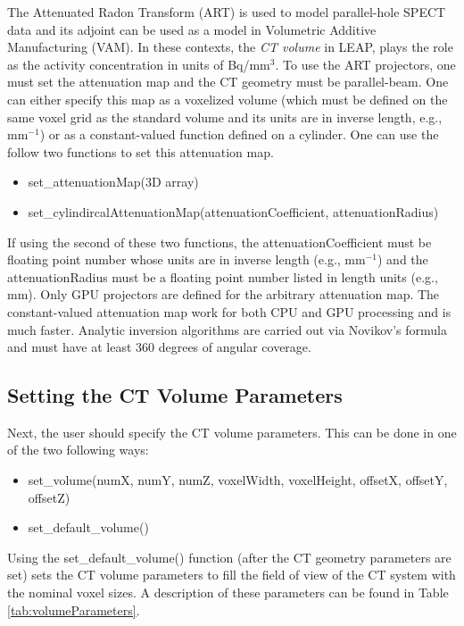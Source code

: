\documentclass[11pt]{article}
\begin{document}
The Attenuated Radon Transform (ART) is used to model parallel-hole SPECT data and its adjoint can be used as a model in Volumetric Additive Manufacturing (VAM).  In  these contexts, the \textit{CT volume} in LEAP, plays the role as the activity concentration in units of Bq/mm$^3$.  To use the ART projectors, one must set the attenuation map and the CT geometry must be parallel-beam.  One can either specify this map as a voxelized volume (which must be defined on the same voxel grid as the standard volume and its units are in inverse length, e.g., mm$^{-1}$) or as a constant-valued function defined on a cylinder.  One can use the follow two functions to set this attenuation map.
\begin{itemize}
    \item[] set\_attenuationMap(3D array)
    \item[] set\_cylindircalAttenuationMap(attenuationCoefficient, attenuationRadius)
\end{itemize}
If using the second of these two functions, the attenuationCoefficient must be floating point number whose units are in inverse length (e.g., mm$^{-1}$) and the attenuationRadius must be a floating point number listed in length units (e.g., mm).  Only GPU projectors are defined for the arbitrary attenuation map.  The constant-valued attenuation map work for both CPU and GPU processing and is much faster.  Analytic inversion algorithms are carried out via Novikov's formula \cite{Natterer_IP_2001} and must have at least 360 degrees of angular coverage.

\subsection{Setting the CT Volume Parameters}

Next, the user should specify the CT volume parameters.  This can be done in one of the two following ways:
\begin{itemize}
\item[] set\_volume(numX, numY, numZ, voxelWidth, voxelHeight, offsetX, offsetY, offsetZ)
\item[] set\_default\_volume()
\end{itemize}
Using the set\_default\_volume() function (after the CT geometry parameters are set) sets the CT volume parameters to fill the field of view of the CT system with the nominal voxel sizes.  A description of these parameters can be found in Table \ref{tab:volumeParameters}.
\end{document}
